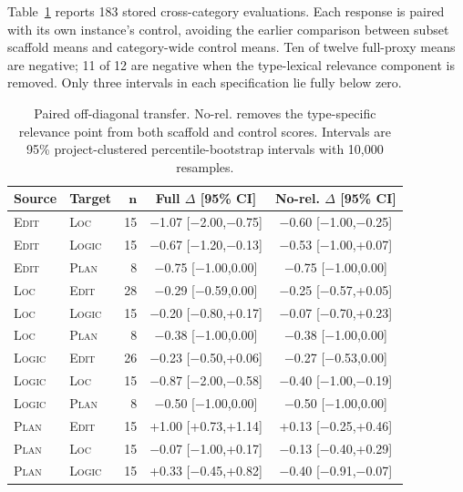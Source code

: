 \documentclass{article}
\begin{document}
Table~\ref{tab:cross-type} reports 183 stored cross-category evaluations.  Each
response is paired with its own instance's control, avoiding the earlier
comparison between subset scaffold means and category-wide control means.  Ten
of twelve full-proxy means are negative; 11 of 12 are negative when the
type-lexical relevance component is removed.  Only three intervals in each
specification lie fully below zero.

\begin{table}[H]
\centering
\scriptsize
\setlength{\tabcolsep}{3.2pt}
\begin{tabular}{@{}llrcc@{}}
\toprule
\textbf{Source} & \textbf{Target} & $\boldsymbol{n}$ & \textbf{Full $\Delta$ [95\% CI]} & \textbf{No-rel. $\Delta$ [95\% CI]} \\
\midrule
\textsc{Edit} & \textsc{Loc} & 15 & $-$1.07 [$-$2.00,$-$0.75] & $-$0.60 [$-$1.00,$-$0.25] \\
\textsc{Edit} & \textsc{Logic} & 15 & $-$0.67 [$-$1.20,$-$0.13] & $-$0.53 [$-$1.00,+0.07] \\
\textsc{Edit} & \textsc{Plan} & 8 & $-$0.75 [$-$1.00,0.00] & $-$0.75 [$-$1.00,0.00] \\
\midrule
\textsc{Loc} & \textsc{Edit} & 28 & $-$0.29 [$-$0.59,0.00] & $-$0.25 [$-$0.57,+0.05] \\
\textsc{Loc} & \textsc{Logic} & 15 & $-$0.20 [$-$0.80,+0.17] & $-$0.07 [$-$0.70,+0.23] \\
\textsc{Loc} & \textsc{Plan} & 8 & $-$0.38 [$-$1.00,0.00] & $-$0.38 [$-$1.00,0.00] \\
\midrule
\textsc{Logic} & \textsc{Edit} & 26 & $-$0.23 [$-$0.50,+0.06] & $-$0.27 [$-$0.53,0.00] \\
\textsc{Logic} & \textsc{Loc} & 15 & $-$0.87 [$-$2.00,$-$0.58] & $-$0.40 [$-$1.00,$-$0.19] \\
\textsc{Logic} & \textsc{Plan} & 8 & $-$0.50 [$-$1.00,0.00] & $-$0.50 [$-$1.00,0.00] \\
\midrule
\textsc{Plan} & \textsc{Edit} & 15 & +1.00 [+0.73,+1.14] & +0.13 [$-$0.25,+0.46] \\
\textsc{Plan} & \textsc{Loc} & 15 & $-$0.07 [$-$1.00,+0.17] & $-$0.13 [$-$0.40,+0.29] \\
\textsc{Plan} & \textsc{Logic} & 15 & +0.33 [$-$0.45,+0.82] & $-$0.40 [$-$0.91,$-$0.07] \\
\bottomrule
\end{tabular}
\caption{Paired off-diagonal transfer.  No-rel. removes the type-specific
relevance point from both scaffold and control scores.  Intervals are 95\%
project-clustered percentile-bootstrap intervals with 10,000 resamples.}
\label{tab:cross-type}
\end{table}


\FloatBarrier

\end{document}
